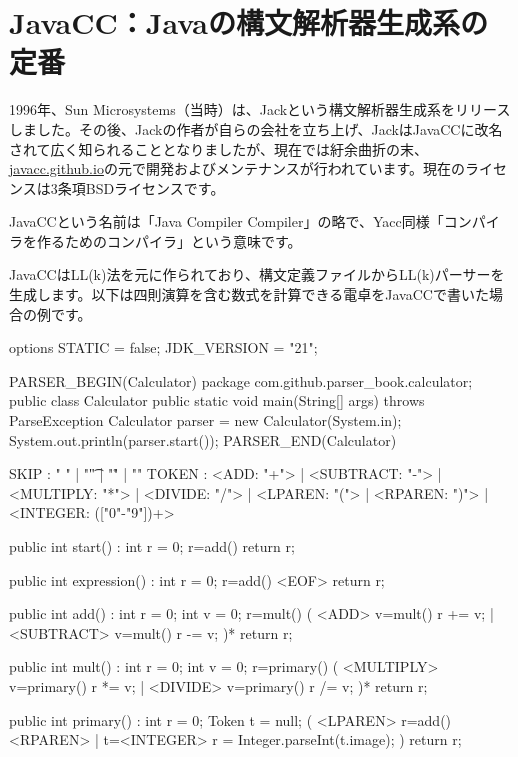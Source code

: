 \section{JavaCC：Javaの構文解析器生成系の定番}

1996年、Sun
Microsystems（当時）は、Jackという構文解析器生成系をリリースしました。その後、Jackの作者が自らの会社を立ち上げ、JackはJavaCCに改名されて広く知られることとなりましたが、現在では紆余曲折の末、\href{https://javacc.github.io/javacc}{javacc.github.io}の元で開発およびメンテナンスが行われています。現在のライセンスは3条項BSDライセンスです。

JavaCCという名前は「Java Compiler
Compiler」の略で、Yacc同様「コンパイラを作るためのコンパイラ」という意味です。

JavaCCはLL(k)法を元に作られており、構文定義ファイルからLL(k)パーサーを生成します。以下は四則演算を含む数式を計算できる電卓をJavaCCで書いた場合の例です。

\begin{codescreen}{}
options {
  STATIC = false;
  JDK_VERSION = "21";
}

PARSER_BEGIN(Calculator)
package com.github.parser_book.calculator;
public class Calculator {
  public static void main(String[] args) throws ParseException {
    Calculator parser = new Calculator(System.in);
    System.out.println(parser.start());
  }
}
PARSER_END(Calculator)

SKIP : { " " | "\t"  | "\r" | "\n" }
TOKEN : {
  <ADD: "+">
| <SUBTRACT: "-">
| <MULTIPLY: "*">
| <DIVIDE: "/">
| <LPAREN: "(">
| <RPAREN: ")">
| <INTEGER: (["0"-"9"])+>
}

public int start() :
{int r = 0;}
{
  r=add() { return r; }
}

public int expression() :
{int r = 0;}
{
  r=add() <EOF> { return r; }
}

public int add() :
{int r = 0; int v = 0;}
{
    r=mult() ( <ADD> v=mult() { r += v; }| <SUBTRACT> v=mult() { r -= v; })* {
        return r;
    }
}


public int mult() :
{int r = 0; int v = 0;}
{
   r=primary() ( 
     <MULTIPLY> v=primary() { r *= v; }
   | <DIVIDE> v=primary() { r /= v; })* { return r; }
}

public int primary() :
{int r = 0; Token t = null;}
{
(
  <LPAREN> r=add() <RPAREN>
| t=<INTEGER> { r = Integer.parseInt(t.image); }
) { return r; }
}
\end{codescreen}

